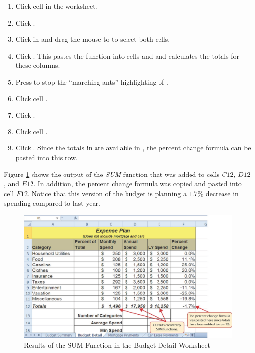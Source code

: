 \begin{enumerate}
	\item Click cell  in the  worksheet.
	\item Click .
	\item Click in  and drag the mouse to  to select both cells.
	\item Click . This pastes the  function into cells  and  and calculates the totals for these columns.
	\item Press  to stop the ``marching ants'' highlighting of .
	\item Click cell .
	\item Click .
	\item Click cell .
	\item Click . Since the totals in are available in , the percent change formula can be pasted into this row.
\end{enumerate}

Figure \ref{02:fig12} shows the output of the \textit{SUM} function that was added to cells $ C12 $, $ D12 $, and $ E12 $. In addition, the percent change formula was copied and pasted into cell $ F12 $. Notice that this version of the budget is planning a $ 1.7 $\% decrease in spending compared to last year.

\begin{figure}[H]
	\centering
	\includegraphics[width=\maxwidth{.95\linewidth}]{gfx/ch02_fig12}
	\caption{Results of the SUM Function in the Budget Detail Worksheet}
	\label{02:fig12}
\end{figure}

